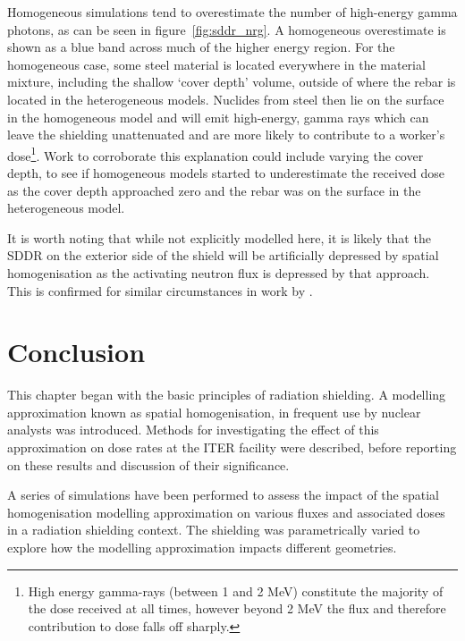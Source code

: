 Homogeneous simulations tend to overestimate the number of high-energy gamma photons, as can be seen in figure~\ref{fig:sddr_nrg}. A homogeneous overestimate is shown as a blue band across much of the higher energy region. For the homogeneous case, some steel material is located everywhere in the material mixture, including the shallow `cover depth' volume, outside of where the rebar is located in the heterogeneous models. Nuclides from steel then lie on the surface in the homogeneous model and will emit high-energy, gamma rays which can leave the shielding unattenuated and are more likely to contribute to a worker's dose\footnote{High energy gamma-rays (between 1 and 2 MeV) constitute the majority of the dose received at all times, however beyond 2 MeV the flux and therefore contribution to dose falls off sharply.}. Work to corroborate this explanation could include varying the cover depth, to see if homogeneous models started to underestimate the received dose as the cover depth approached zero and the rebar was on the surface in the heterogeneous model.

It is worth noting that while not explicitly modelled here, it is likely that the SDDR on the exterior side of the shield will be artificially depressed by spatial homogenisation as the activating neutron flux is depressed by that approach. This is confirmed for similar circumstances in work by \citeauthor{Sanz2014} \cite{Sanz2014}.


\FloatBarrier
\section{Conclusion}
This chapter began with the basic principles of radiation shielding. A modelling approximation known as spatial homogenisation, in frequent use by nuclear analysts was introduced. Methods for investigating the effect of this approximation on dose rates at the ITER facility were described, before reporting on these results and discussion of their significance.

A series of simulations have been performed to assess the impact of the spatial homogenisation modelling approximation on various fluxes and associated doses in a radiation shielding context. The shielding was parametrically varied to explore how the modelling approximation impacts different geometries.

